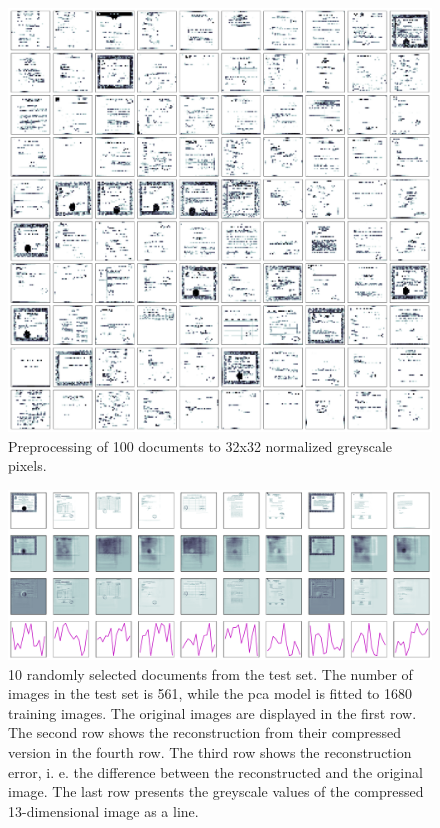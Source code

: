 \begin{figure}[!htb] %
    \centering
    \includegraphics[width=1\textwidth]{images/OPTICS/32x32/preprocessed_docs.pdf}
    \caption[Preprocessing to 32x32 normalized greyscale pixels]{Preprocessing of 100 documents to 32x32 normalized greyscale pixels.
    }
    \label{fig:preprocessed_docs_32x32}
\end{figure}


\begin{figure}[!htb] %
    \centering
    \includegraphics[width=1\textwidth]{images/Eigendocs/transformation/eigendocs.pdf}
    \caption[Preprocessing 10 randomly selected documents from the test set]{10 randomly selected documents from the test set.
    The number of images in the test set is 561, while the \ac{pca} model is fitted to 1680 training images.
    The original images are displayed in the first row.
    The second row shows the reconstruction from their compressed version in the fourth row.
    The third row shows the reconstruction error, i. e. the difference between the reconstructed and the original image.
    The last row presents the greyscale values of the compressed 13-dimensional image as a line.
    }
    \label{fig:preprocessed_docs_eigendocs}
\end{figure}

